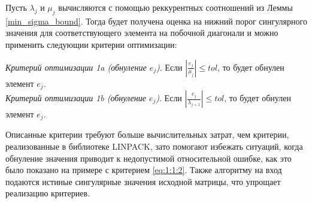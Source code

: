 Пусть $\lambda_j$ и $\mu_j$ вычисляются с помощью реккурентных соотношений из Леммы \ref{min_sigma_bound}. Тогда будет получена оценка на нижний порог сингулярного значения для соответствующего элемента на побочной диагонали и можно применить следующии критерии оптимизации\cite{Demmel1990}:

\noindent\textit{Критерий оптимизации 1a (обнуление $e_j$)}. Если $|\frac{e_j}{\mu_j}|\leq tol$, то будет обнулен элемент $e_j$.\vspace{1em}
\\\textit{Критерий оптимизации 1b (обнуление $e_j$)}. Если $|\frac{e_j}{\lambda_{j+1}}|\leq tol$, то будет обнулен элемент $e_j$.\vspace{1em}

Описанные критерии требуют больше вычислительных затрат, чем критерии, реализованные в библиотеке LINPACK, зато помогают избежать ситуаций, когда обнуление значения приводит к недопустимой относительной ошибке, как это было показано на примере с критерием \eqref{eq:1:1:2}. Также алгоритму на вход подаются истиные сингулярные значения исходной матрицы, что упрощает реализацию критериев.



